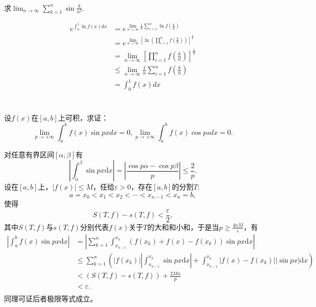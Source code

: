 \begin{example}
\hfill\\
 求$\displaystyle\lim_{n\rightarrow\infty}\sum_{k=1}^n\sin\frac k{n^2}$.

  \begin{equation*}
  \begin{aligned}
  e^{\int_0^1\ln f(x)dx}&=\displaystyle e^{\lim_{n\rightarrow\infty}\frac1n\sum_{i=1}^n\ln f(\frac kn)}\\
  &=e^{\lim_{n\rightarrow\infty}[\ln(\prod_{i=1}^nf(\frac kn))]^{\frac1n}}\\
  &=\lim_{n\rightarrow\infty}[\prod_{i=1}^nf(\frac kn)]^{\frac1n}\\
  &\leq\lim_{n\rightarrow\infty}\frac1n\sum_{i=1}^nf(\frac kn)\\
  &=\int_0^1f(x)dx\\
  \end{aligned}
  \end{equation*}
\end{example}
\begin{example}
\hfill\\
 设$f(x)$在$[a,b]$上可积，求证：$$\displaystyle\lim_{p\rightarrow+\infty}\int_a^bf(x)\sin pxdx=0,\lim_{p\rightarrow+\infty}\int_a^bf(x)\cos psdx=0.$$
 
 对任意有界区间$[\alpha,\beta]$有$$|\int_{\alpha}^{\beta}\sin px\mathrm{d}x|=|\frac{\cos p\alpha-\cos p\beta}{p}|\leq\frac{2}{p}.$$
设在$[a,b]$上，$|f(x)|\leq M$，任给$\varepsilon>0$，存在$[a,b]$的分割$T$:
$$a=x_0<x_1<x_2<\cdots<x_{n-1}<x_n=b,$$
使得
$$S(T,f)-s(T,f)<\frac{\varepsilon}{2},$$
其中$S(T,f)$与$s(T,f)$分别代表$f(x)$关于$T$的大和和小和，于是当$p\geq\frac{4nM}{\varepsilon}$，有
\begin{align*}
|\int_a^bf(x)\sin px\mathrm{d}x|&=
|\sum_{k=1}^n\int_{x_{k-1}}^{x_k}(f(x_k)+f(x)-f(x_k))\sin px\mathrm{d}x|\\
&\leq\sum_{k=1}^n(|f(x_k)||\int_{x_{k-1}}^{x_k}\sin px\mathrm{d}x|+\int_{x_{k-1}}^{x_k}|f(x)-f(x_k)||\sin px|\mathrm{d}x)\\
&<(S(T,f)-s(T,f))+\frac{2Mn}{p}\\
&<\varepsilon.\\
\end{align*}
同理可证后者极限等式成立。
\end{example}
